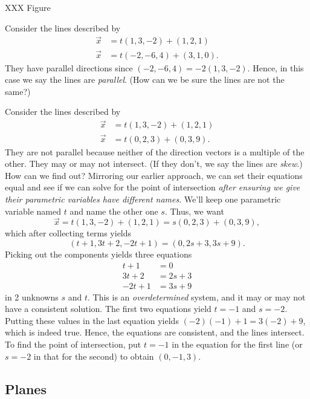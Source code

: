 XXX Figure

\begin{example}
Consider the lines described by
\begin{align*}
\vec x &= t( 1, 3, -2 ) + ( 1, 2, 1 ) \\
\vec x &= t( -2, -6, 4) + ( 3, 1, 0 ).
\end{align*}
They have parallel directions since $( -2, -6, 4 ) = -2( 1, 3,-2 )$.
Hence, in this case we say the lines are \emph{parallel}.  (How can
we be sure the lines are not the same?)
\end{example}

\begin{example}
Consider the lines described by
\begin{align*}
	\vec x &= t(1, 3, -2 ) + ( 1, 2, 1 ) \\
	\vec x &= t( 0, 2, 3) + ( 0, 3, 9 ).
\end{align*}
They are not parallel because neither of the direction
vectors is a multiple
of the other.  They may or may not intersect.  (If they don't,
	we say the lines are \emph{skew}.)  How can we find out?  
	Mirroring our earlier approach, 
	we can set their equations equal and see if we can solve for the point
	of intersection \emph{after ensuring we give their parametric variables
	have
	different names}.   We'll keep one parametric variable named $t$ and name the
	other one $s$.  Thus, we want
\[
\vec x = t( 1, 3, -2 ) + ( 1, 2, 1 ) =
s( 0, 2, 3) + ( 0, 3, 9 ),
\]
which after collecting terms yields
\[
    ( t + 1, 3t + 2, -2t + 1 ) = ( 0, 2s + 3, 3s + 9).
\]
Picking out the components yields three equations
\begin{align*}
    t + 1 &= 0 \\
    3t +2 &= 2s + 3 \\
    -2t + 1 &=  3s + 9
\end{align*}
in 2 unknowns  $s$ and $t$.  This is an {\it overdetermined\/}
system, and it may or may not have a consistent solution.  
The first two equations yield $t = -1$  and $s = -2$.  Putting
these values in the last equation yields $(-2)(-1) + 1 = 3(-2) + 9$,
which is indeed true.
Hence, the equations are consistent, and the lines
intersect.   To find the point of intersection, put $t = -1$
in the equation for the first line (or
$s = -2$ in that for the second) to obtain  $( 0, -1, 3 )$.  
\end{example}

\subsection{Planes}

